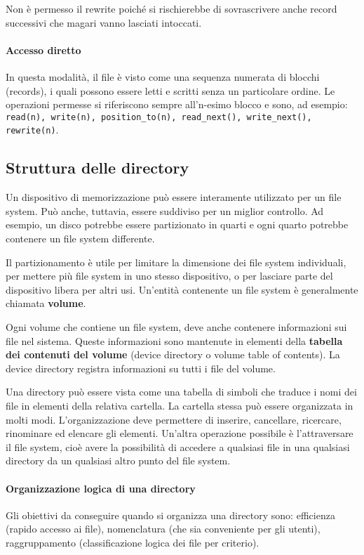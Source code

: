 \documentclass[a4]{article}
\begin{document}
Non è permesso il rewrite poiché si rischierebbe di sovrascrivere anche record successivi che magari vanno lasciati intoccati.

\paragraph{Accesso diretto}
In questa modalità, il file è visto come una sequenza numerata di blocchi (records), i quali possono essere letti e scritti senza un particolare ordine. Le operazioni permesse si riferiscono sempre all'n-esimo blocco e sono, ad esempio: \texttt{read(n), write(n), position\_to(n), read\_next(), write\_next(), rewrite(n)}.

\subsection{Struttura delle directory}
Un dispositivo di memorizzazione può essere interamente utilizzato per un file system. Può anche, tuttavia, essere suddiviso per un miglior controllo. Ad esempio, un disco potrebbe essere partizionato in quarti e ogni quarto potrebbe contenere un file system differente.

Il partizionamento è utile per limitare la dimensione dei file system individuali, per mettere più file system in uno stesso dispositivo, o per lasciare parte del dispositivo libera per altri usi. Un'entità contenente un file system è generalmente chiamata \textbf{volume}.

Ogni volume che contiene un file system, deve anche contenere informazioni sui file nel sistema. Queste informazioni sono mantenute in elementi della \textbf{tabella dei contenuti del volume} (device directory o volume table of contents). La device directory registra informazioni su tutti i file del volume.

Una directory può essere vista come una tabella di simboli che traduce i nomi dei file in elementi della relativa cartella. La cartella stessa può essere organizzata in molti modi. L'organizzazione deve permettere di inserire, cancellare, ricercare, rinominare ed elencare gli elementi. Un'altra operazione possibile è l'attraversare il file system, cioè avere la possibilità di accedere a qualsiasi file in una qualsiasi directory da un qualsiasi altro punto del file system.

\paragraph{Organizzazione logica di una directory}
Gli obiettivi da conseguire quando si organizza una directory sono: efficienza (rapido accesso ai file), nomenclatura (che sia conveniente per gli utenti), raggruppamento (classificazione logica dei file per criterio).
\newline
\end{document}
